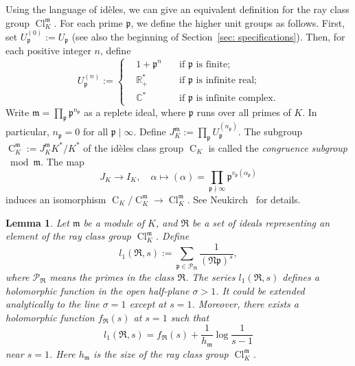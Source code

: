 \documentclass{amsart}
\numberwithin{equation}{section}
\theoremstyle{plain}
\newtheorem{lemma}[theorem]{Lemma}
\theoremstyle{definition}
\theoremstyle{remark}
\begin{document}
Using the language of id{\`e}les, we can give an equivalent definition for the ray class group $\operatorname{Cl}_K^{\mathfrak{m}}$.
For each prime $\mathfrak{p}$, we define the higher unit groups as follows.
First, set $U_{\mathfrak{p}}^{(0)}:=U_{\mathfrak{p}}$ (see also the beginning of Section~\ref{sec: specifications}).
Then, for each positive integer $n$, define
\begin{equation*}
	U_{\mathfrak{p}}^{(n)}:=\left\{\begin{aligned}
		&1+\mathfrak{p}^n\quad&\text{if }\mathfrak{p}\text{ is finite};
		\\
		&\mathbb{R}_+^*\quad&\text{if }\mathfrak{p}\text{ is infinite real};
		\\
		&\mathbb{C}^*\quad&\text{if }\mathfrak{p}\text{ is infinite complex}.
	\end{aligned}\right.
\end{equation*}
Write $\mathfrak{m}=\prod_{\mathfrak{p}}\mathfrak{p}^{n_{\mathfrak{p}}}$ as a replete ideal, where $\mathfrak{p}$ runs over all primes of $K$.
In particular, $n_{\mathfrak{p}}=0$ for all $\mathfrak{p}\mid\infty$.
Define $J_K^{\mathfrak{m}}:=\prod_{\mathfrak{p}}U_{\mathfrak{p}}^{(n_{\mathfrak{p}})}$.
The subgroup $\operatorname{C}_K^{\mathfrak{m}}:=J_K^{\mathfrak{m}}K^*/K^*$ of the id{\`e}les class group $\operatorname{C}_K$ is called the \emph{congruence subgroup} $\bmod{\mathfrak{m}}$.
The map
\begin{equation*}
	J_K\to I_K,\quad\alpha\mapsto(\alpha)=\prod_{\mathfrak{p}\nmid\infty}\mathfrak{p}^{v_{\mathfrak{p}}(\alpha_{\mathfrak{p}})}
\end{equation*}
induces an isomorphism $\operatorname{C}_K/\operatorname{C}_K^{\mathfrak{m}}\to\operatorname{Cl}_K^{\mathfrak{m}}$.
See Neukirch~\cite[VI.1.9]{neukirch2013algebraic} for details.
\begin{lemma}\label{lemma: l(1,s)}
    Let $\mathfrak{m}$ be a module of $K$, and $\mathfrak{R}$ be a set of ideals representing an element of the ray class group $\operatorname{Cl}_K^{\mathfrak{m}}$.
    Define
	\begin{equation*}
		l_1(\mathfrak{R},s):=\sum_{\mathfrak{p}\in\mathcal{P}_{\mathfrak{R}}}\frac{1}{(\mathfrak{N}\mathfrak{p})^s},
	\end{equation*}
	where $\mathcal{P}_{\mathfrak{R}}$ means the primes in the class $\mathfrak{R}$.
	The series $l_1(\mathfrak{R},s)$ defines a holomorphic function in the open half-plane $\sigma>1$.
	It could be extended analytically to the line $\sigma=1$ except at $s=1$.
	Moreover, there exists a holomorphic function $f_{\mathfrak{R}}(s)$ at $s=1$ such that
	\begin{equation*}
		l_1(\mathfrak{R},s)=f_{\mathfrak{R}}(s)+\frac{1}{h_{\mathfrak{m}}}\log\frac{1}{s-1}
	\end{equation*}
	near $s=1$.
	Here $h_{\mathfrak{m}}$ is the size of the ray class group $\operatorname{Cl}_K^{\mathfrak{m}}$.
\end{lemma}
\end{document}
